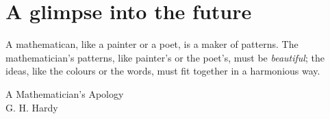 \documentclass[12pt,letterpaper]{book}
\theoremstyle{definition} \newtheorem{definition}{Definición}[section]
\theoremstyle{plain} \newtheorem{theorem}{Teorema}[section]
\theoremstyle{plain} \newtheorem{lemma}{Lema}[section]
\theoremstyle{plain} \newtheorem{proposition}[theorem]{Proposici\'on}
\theoremstyle{plain} \newtheorem{corollary}[theorem]{Corolario}
\theoremstyle{plain} \newtheorem{remark}[theorem]{Comentario}
\begin{document}
\chapter{A glimpse into the future}
\epigraph{A mathematican, like a painter or a poet, is a maker of patterns. The mathematician's patterns, like painter's or the poet's, must be \emph{beautiful}; the ideas, like the colours or the words, must fit together in a harmonious way.}{A Mathematician's Apology \\ G. H. Hardy}


\iffalse

\backmatter
\appendix
\chapter{Appendix A}

\chapter{Appendix B}

\chapter{Appendix C}


\fi

\cleardoublepage
{}


\cleardoublepage
\printindex
\end{document}
